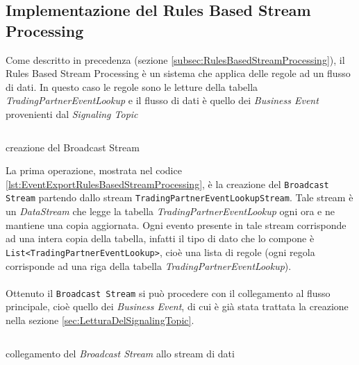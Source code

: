 \subsection{Implementazione del Rules Based Stream Processing}
\label{subsec:ImplementazioneDelRulesBasedStreamProcessing}
Come descritto in precedenza (sezione \ref{subsec:RulesBasedStreamProcessing}), il Rules Based Stream Processing è un sistema che applica delle regole ad un flusso di dati.
In questo caso le regole sono le letture della tabella \textit{TradingPartnerEventLookup} e il flusso di dati è quello dei \textit{Business Event} provenienti dal \textit{Signaling Topic}
\begin{code}
    \inputminted[linenos,fontsize=\footnotesize]{java}{listings/EventsExport/TradingPartnerBroadcast.java}
    \caption{creazione del Broadcast Stream}
    \label{lst:EventExportRulesBasedStreamProcessing}
\end{code}
La prima operazione, mostrata nel codice \ref{lst:EventExportRulesBasedStreamProcessing}, è la creazione del \texttt{Broadcast Stream} partendo dallo stream \texttt{TradingPartnerEventLookupStream}.
Tale stream è un \textit{DataStream} che legge la tabella \textit{TradingPartnerEventLookup} ogni ora e ne mantiene una copia aggiornata. 
Ogni evento presente in tale stream corrisponde ad una intera copia della tabella, infatti il tipo di dato che lo compone è \texttt{List<TradingPartnerEventLookup>}, 
cioè una lista di regole (ogni regola corrisponde ad una riga della tabella \textit{TradingPartnerEventLookup}).\\\\
Ottenuto il \texttt{Broadcast Stream} si può procedere con il collegamento al flusso principale, cioè quello dei \textit{Business Event},
di cui è già stata trattata la creazione nella sezione \ref{sec:LetturaDelSignalingTopic}. 
\begin{code}
    \inputminted[linenos,fontsize=\footnotesize]{java}{listings/EventsExport/StreamConnection.java}
    \caption{collegamento del \textit{Broadcast Stream} allo stream di dati}
    \label{lst:StreamsConnection}
\end{code}